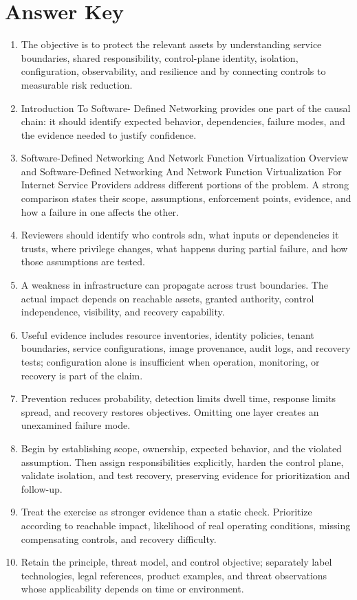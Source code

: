 \documentclass[11pt,letterpaper]{article}
\begin{document}
\section*{Answer Key}
\begin{enumerate}
\item The objective is to protect the relevant assets by understanding service boundaries, shared responsibility, control-plane identity, isolation, configuration, observability, and resilience and by connecting controls to measurable risk reduction.
\item Introduction To Software- Defined Networking provides one part of the causal chain: it should identify expected behavior, dependencies, failure modes, and the evidence needed to justify confidence.
\item Software-Defined Networking And Network Function Virtualization Overview and Software-Defined Networking And Network Function Virtualization For Internet Service Providers address different portions of the problem. A strong comparison states their scope, assumptions, enforcement points, evidence, and how a failure in one affects the other.
\item Reviewers should identify who controls sdn, what inputs or dependencies it trusts, where privilege changes, what happens during partial failure, and how those assumptions are tested.
\item A weakness in infrastructure can propagate across trust boundaries. The actual impact depends on reachable assets, granted authority, control independence, visibility, and recovery capability.
\item Useful evidence includes resource inventories, identity policies, tenant boundaries, service configurations, image provenance, audit logs, and recovery tests; configuration alone is insufficient when operation, monitoring, or recovery is part of the claim.
\item Prevention reduces probability, detection limits dwell time, response limits spread, and recovery restores objectives. Omitting one layer creates an unexamined failure mode.
\item Begin by establishing scope, ownership, expected behavior, and the violated assumption. Then assign responsibilities explicitly, harden the control plane, validate isolation, and test recovery, preserving evidence for prioritization and follow-up.
\item Treat the exercise as stronger evidence than a static check. Prioritize according to reachable impact, likelihood of real operating conditions, missing compensating controls, and recovery difficulty.
\item Retain the principle, threat model, and control objective; separately label technologies, legal references, product examples, and threat observations whose applicability depends on time or environment.
\end{enumerate}
\end{document}
